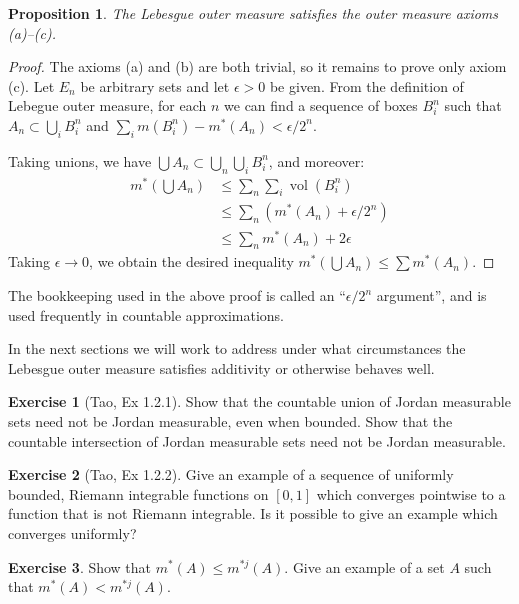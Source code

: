 \documentclass[11pt,oneside]{amsbook}
\DeclareMathOperator{\vol}{vol}
\theoremstyle{definition}
\newtheorem{exerc}{Exercise}[section]
\theoremstyle{plain}
\newtheorem{prop}[thm]{Proposition}
\theoremstyle{definition}
\theoremstyle{remark}
\numberwithin{equation}{section}
\numberwithin{figure}{section}
\begin{document}
\begin{prop}
  The Lebesgue outer measure satisfies the outer measure axioms (a)--(c).
\end{prop}

\begin{proof}
  The axioms (a) and (b) are both trivial, so it remains to prove only axiom (c). Let $E_n$ be arbitrary sets and let $\epsilon>0$ be given. From the definition of Lebegue outer measure, for each $n$ we can find a sequence of boxes $B_i^n$ such that $A_n\subset\bigcup_iB_i^n$ and $\sum_im(B_i^n)-m^*(A_n)<\epsilon/2^n$.

  Taking unions, we have $\bigcup A_n\subset\bigcup_n\bigcup_iB_i^n$, and moreover:
  \begin{align*}
    m^*(\bigcup A_n)&\leq\sum_n\sum_i\vol(B_i^n)\\
                    &\leq\sum_n\left(m^*(A_n)+\epsilon/2^n\right)\\
                    &\leq\sum_nm^*(A_n)+2\epsilon
  \end{align*}
  Taking $\epsilon\to0$, we obtain the desired inequality $m^*(\bigcup A_n)\leq\sum m^*(A_n)$.
\end{proof}

The bookkeeping used in the above proof is called an ``$\epsilon/2^n$ argument'', and is used frequently in countable approximations.

In the next sections we will work to address under what circumstances the Lebesgue outer measure satisfies additivity or otherwise behaves well.

\begin{exerc}[Tao, Ex 1.2.1]
  Show that the countable union of Jordan measurable sets need not be Jordan measurable, even when bounded. Show that the countable intersection of Jordan measurable sets need not be Jordan measurable.
\end{exerc}

\begin{exerc}[Tao, Ex 1.2.2]
  Give an example of a sequence of uniformly bounded, Riemann integrable functions on $[0,1]$ which converges pointwise to a function that is not Riemann integrable. Is it possible to give an example which converges uniformly?
\end{exerc}

\begin{exerc}
  Show that $m^*(A)\leq m^{*j}(A)$. Give an example of a set $A$ such that $m^*(A)<m^{*j}(A)$.
\end{exerc}
\end{document}
